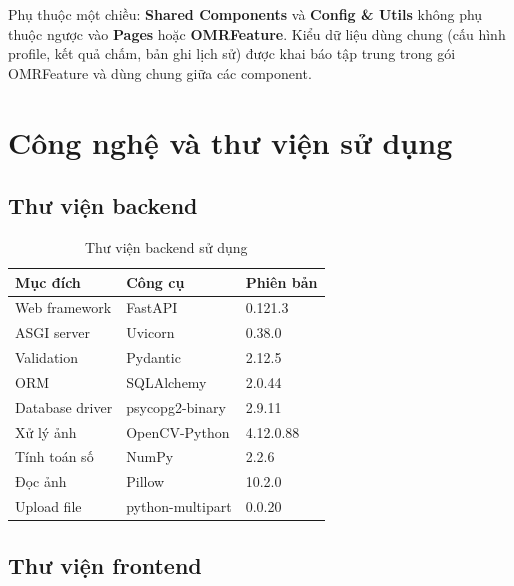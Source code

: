 Phụ thuộc một chiều: \textbf{Shared Components} và \textbf{Config \& Utils} không phụ thuộc ngược vào \textbf{Pages} hoặc \textbf{OMRFeature}. Kiểu dữ liệu dùng chung (cấu hình profile, kết quả chấm, bản ghi lịch sử) được khai báo tập trung trong gói OMRFeature và dùng chung giữa các component.

\section{Công nghệ và thư viện sử dụng}
\subsection{Thư viện backend}

\begin{table}[H]
\centering
\caption{Thư viện backend sử dụng}
\label{tab:thu-vien-backend}
\begin{tabular}{|L{3.7cm}|L{5.2cm}|L{3.0cm}|}
\hline
\textbf{Mục đích} & \textbf{Công cụ} & \textbf{Phiên bản} \\
\hline
Web framework & FastAPI & 0.121.3 \\
\hline
ASGI server & Uvicorn & 0.38.0 \\
\hline
Validation & Pydantic & 2.12.5 \\
\hline
ORM & SQLAlchemy & 2.0.44 \\
\hline
Database driver & psycopg2-binary & 2.9.11 \\
\hline
Xử lý ảnh & OpenCV-Python & 4.12.0.88 \\
\hline
Tính toán số & NumPy~\cite{numpy} & 2.2.6 \\
\hline
Đọc ảnh & Pillow & 10.2.0 \\
\hline
Upload file & python-multipart & 0.0.20 \\
\hline
\end{tabular}
\end{table}

\subsection{Thư viện frontend}

